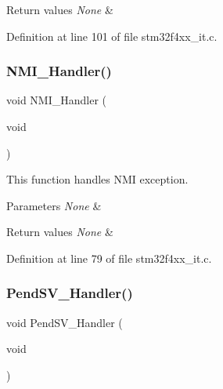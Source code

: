 \begin{DoxyRetVals}{Return values}
{\em None} & \\
\hline
\end{DoxyRetVals}


Definition at line 101 of file stm32f4xx\+\_\+it.\+c.

\mbox{\label{group___templates_ga6ad7a5e3ee69cb6db6a6b9111ba898bc}} 
\subsubsection{\texorpdfstring{N\+M\+I\+\_\+\+Handler()}{NMI\_Handler()}}
{\footnotesize\ttfamily void N\+M\+I\+\_\+\+Handler (\begin{DoxyParamCaption}\item[{void}]{ }\end{DoxyParamCaption})}



This function handles N\+MI exception. 


\begin{DoxyParams}{Parameters}
{\em None} & \\
\hline
\end{DoxyParams}

\begin{DoxyRetVals}{Return values}
{\em None} & \\
\hline
\end{DoxyRetVals}


Definition at line 79 of file stm32f4xx\+\_\+it.\+c.

\mbox{\label{group___templates_ga6303e1f258cbdc1f970ce579cc015623}} 
\subsubsection{\texorpdfstring{Pend\+S\+V\+\_\+\+Handler()}{PendSV\_Handler()}}
{\footnotesize\ttfamily void Pend\+S\+V\+\_\+\+Handler (\begin{DoxyParamCaption}\item[{void}]{ }\end{DoxyParamCaption})}



